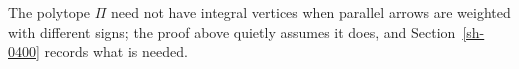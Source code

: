 \begin{caveat}\label{sh-000D}
The polytope $\Pi$ need not have integral vertices when parallel arrows are weighted with different signs; the proof above quietly assumes it does, and Section~\ref{sh-0400} records what is needed.
\end{caveat}